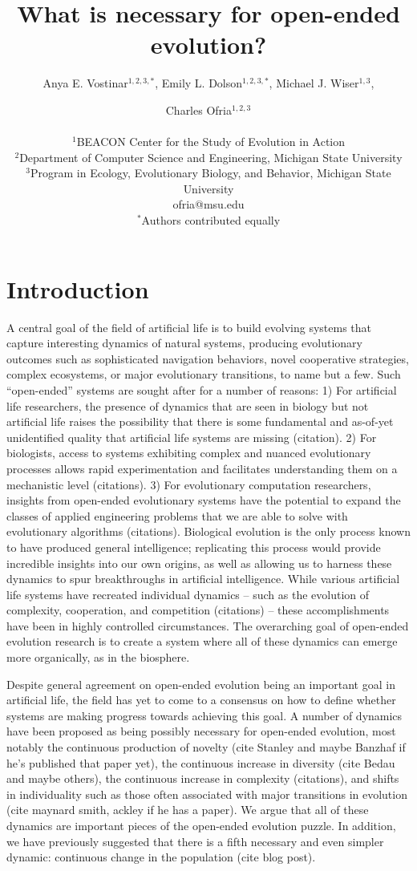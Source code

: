 \documentclass[letterpaper]{article}
\title{What is necessary for open-ended evolution?}
\author{Anya E. Vostinar$^{1,2,3,*}$, Emily L. Dolson$^{1,2,3,*}$, Michael J. Wiser$^{1,3}$,\and Charles Ofria$^{1,2,3}$ \\
\mbox{}\\
$^1$BEACON Center for the Study of Evolution in Action  \\
$^2$Department of Computer Science and Engineering, Michigan State University \\
$^3$Program in Ecology, Evolutionary Biology, and Behavior, Michigan State University \\
ofria@msu.edu\\
$^*$Authors contributed equally}
\begin{document}
\maketitle


\section{Introduction}

    A central goal of the field of artificial life is to build evolving systems that capture interesting dynamics of natural systems, producing evolutionary outcomes such as sophisticated navigation behaviors, novel cooperative strategies, complex ecosystems, or major evolutionary transitions, to name but a few. Such ``open-ended'' systems are sought after for a number of reasons: 1) For artificial life researchers, the presence of dynamics that are seen in biology but not artificial life raises the possibility that there is some fundamental and as-of-yet unidentified quality that artificial life systems are missing (citation). 2) For biologists, access to systems exhibiting complex and nuanced evolutionary processes allows rapid experimentation and facilitates understanding them on a mechanistic level (citations). 3) For evolutionary computation researchers, insights from open-ended evolutionary systems have the potential to expand the classes of applied engineering problems that we are able to solve with evolutionary algorithms (citations). Biological evolution is the only process known to have produced general intelligence; replicating this process would provide incredible insights into our own origins, as well as allowing us to harness these dynamics to spur breakthroughs in artificial intelligence. While various artificial life systems have recreated individual dynamics -- such as the evolution of complexity, cooperation, and competition (citations) -- these accomplishments have been in highly controlled circumstances. The overarching goal of open-ended evolution research is to create a system where all of these dynamics can emerge more organically, as in the biosphere. 
    
Despite general agreement on open-ended evolution being an important goal in artificial life, the field has yet to come to a consensus on how to define whether systems are making progress towards achieving this goal. A number of dynamics have been proposed as being possibly necessary for open-ended evolution, most notably the continuous production of novelty (cite Stanley and maybe Banzhaf if he’s published that paper yet), the continuous increase in diversity (cite Bedau and maybe others), the continuous increase in complexity (citations), and shifts in individuality such as those often associated with major transitions in evolution (cite maynard smith, ackley if he has a paper). We argue that all of these dynamics are important pieces of the open-ended evolution puzzle. In addition, we have previously suggested that there is a fifth necessary and even simpler dynamic: continuous change in the population (cite blog post).
\end{document}
